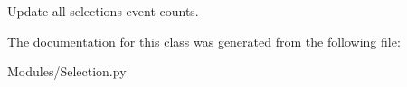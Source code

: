 \begin{DoxyVerb}Update all selections event counts.
\end{DoxyVerb}
 

The documentation for this class was generated from the following file\-:\begin{DoxyCompactItemize}
\item 
Modules/Selection.\-py\end{DoxyCompactItemize}
